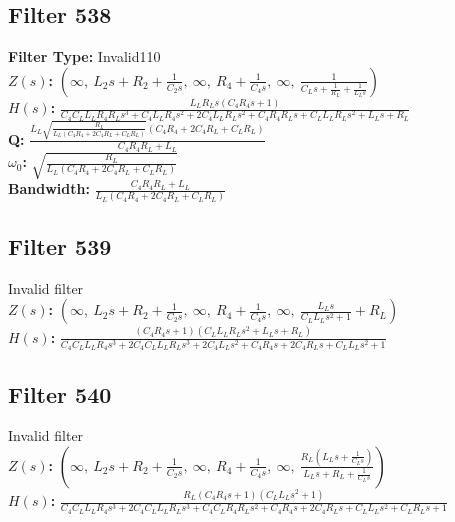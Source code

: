 \documentclass{article}
\begin{document}
\subsection*{Filter 538}
\textbf{Filter Type:} Invalid110 \\ 
\textbf{$Z(s)$:} $\left( \infty, \  L_{2} s + R_{2} + \frac{1}{C_{2} s}, \  \infty, \  R_{4} + \frac{1}{C_{4} s}, \  \infty, \  \frac{1}{C_{L} s + \frac{1}{R_{L}} + \frac{1}{L_{L} s}}\right)$ \\ 
\textbf{$H(s)$:} $\frac{L_{L} R_{L} s \left(C_{4} R_{4} s + 1\right)}{C_{4} C_{L} L_{L} R_{4} R_{L} s^{3} + C_{4} L_{L} R_{4} s^{2} + 2 C_{4} L_{L} R_{L} s^{2} + C_{4} R_{4} R_{L} s + C_{L} L_{L} R_{L} s^{2} + L_{L} s + R_{L}}$ \\ 
\textbf{Q:} $\frac{L_{L} \sqrt{\frac{R_{L}}{L_{L} \left(C_{4} R_{4} + 2 C_{4} R_{L} + C_{L} R_{L}\right)}} \left(C_{4} R_{4} + 2 C_{4} R_{L} + C_{L} R_{L}\right)}{C_{4} R_{4} R_{L} + L_{L}}$ \\ 
\textbf{$\omega_0$:} $\sqrt{\frac{R_{L}}{L_{L} \left(C_{4} R_{4} + 2 C_{4} R_{L} + C_{L} R_{L}\right)}}$ \\ 
\textbf{Bandwidth:} $\frac{C_{4} R_{4} R_{L} + L_{L}}{L_{L} \left(C_{4} R_{4} + 2 C_{4} R_{L} + C_{L} R_{L}\right)}$ \\ 
\subsection*{Filter 539}
Invalid filter \\ 
\textbf{$Z(s)$:} $\left( \infty, \  L_{2} s + R_{2} + \frac{1}{C_{2} s}, \  \infty, \  R_{4} + \frac{1}{C_{4} s}, \  \infty, \  \frac{L_{L} s}{C_{L} L_{L} s^{2} + 1} + R_{L}\right)$ \\ 
\textbf{$H(s)$:} $\frac{\left(C_{4} R_{4} s + 1\right) \left(C_{L} L_{L} R_{L} s^{2} + L_{L} s + R_{L}\right)}{C_{4} C_{L} L_{L} R_{4} s^{3} + 2 C_{4} C_{L} L_{L} R_{L} s^{3} + 2 C_{4} L_{L} s^{2} + C_{4} R_{4} s + 2 C_{4} R_{L} s + C_{L} L_{L} s^{2} + 1}$ \\ 
\subsection*{Filter 540}
Invalid filter \\ 
\textbf{$Z(s)$:} $\left( \infty, \  L_{2} s + R_{2} + \frac{1}{C_{2} s}, \  \infty, \  R_{4} + \frac{1}{C_{4} s}, \  \infty, \  \frac{R_{L} \left(L_{L} s + \frac{1}{C_{L} s}\right)}{L_{L} s + R_{L} + \frac{1}{C_{L} s}}\right)$ \\ 
\textbf{$H(s)$:} $\frac{R_{L} \left(C_{4} R_{4} s + 1\right) \left(C_{L} L_{L} s^{2} + 1\right)}{C_{4} C_{L} L_{L} R_{4} s^{3} + 2 C_{4} C_{L} L_{L} R_{L} s^{3} + C_{4} C_{L} R_{4} R_{L} s^{2} + C_{4} R_{4} s + 2 C_{4} R_{L} s + C_{L} L_{L} s^{2} + C_{L} R_{L} s + 1}$ \\ 
\end{document}

